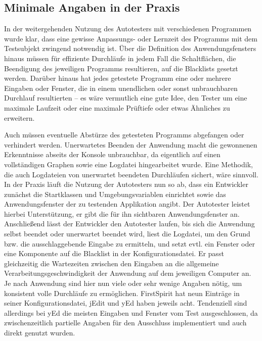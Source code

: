 \subsection{\glqq{}Minimale\grqq{} Angaben in der Praxis}

In der weitergehenden Nutzung des Autotesters mit verschiedenen
Programmen wurde klar, dass eine gewisse Anpassungs- oder
Lernzeit des Programms mit dem Testsubjekt zwingend notwendig ist.
Über die Definition des Anwendungsfensters hinaus müssen für
effiziente Durchläufe in jedem Fall die Schaltflächen, die Beendigung
des jeweiligen Programms resultieren, auf die Blacklists gesetzt
werden. Darüber hinaus hat jedes getestete Programm eine oder
mehrere Eingaben oder Fenster, die in einem unendlichen oder
sonst unbrauchbaren Durchlauf resultierten -- es wäre vermutlich
eine gute Idee, den Tester um eine maximale Laufzeit oder
eine maximale Prüftiefe oder etwas Ähnliches zu erweitern.

Auch müssen eventuelle Abstürze des getesteten Programms
abgefangen oder verhindert werden. Unerwartetes Beenden
der Anwendung macht die gewonnenen Erkenntnisse abseits
der Konsole unbrauchbar, da eigentlich auf einen
vollständigen Graphen sowie eine Logdatei hingearbeitet wurde.
Eine Methodik, die auch Logdateien von unerwartet beendeten
Durchläufen sichert, wäre sinnvoll. In der Praxis läuft
die Nutzung der Autotesters nun so ab, dass ein Entwickler
zunächst die Startklassen und Umgebungsvariablen einrichtet
sowie das Anwendungsfenster der zu testenden Applikation
angibt. Der Autotester leistet hierbei Unterstützung, er
gibt die für ihn sichtbaren Anwendungsfenster an. Anschließend
lässt der Entwickler den Autotester laufen, bis sich die Anwendung
selbst beendet oder unerwartet beendet wird, liest die Logdatei,
um den Grund bzw. die ausschlaggebende Eingabe zu ermitteln,
und setzt evtl. ein Fenster oder eine Komponente auf die
Blacklist in der Konfigurationsdatei. Er passt gleichzeitig
die Wartezeiten zwischen den Eingaben an die allgemeine
Verarbeitungsgeschwindigkeit der Anwendung auf dem jeweiligen
Computer an. Je nach Anwendung sind hier nun viele oder
sehr wenige Angaben nötig, um konsistent volle Durchläufe
zu ermöglichen. FirstSpirit hat neun Einträge
in seiner Konfigurationsdatei, jEdit und yEd haben jeweils
acht. Tendenziell sind allerdings bei yEd die meisten Eingaben
und Fenster vom Test ausgeschlossen, da zwischenzeitlich
partielle Angaben für den Ausschluss implementiert und auch
direkt genutzt wurden.
